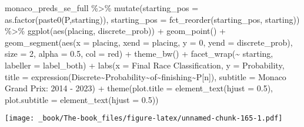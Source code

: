 \documentclass[
]{book}
\newenvironment{Shaded}{\begin{snugshade}}{\end{snugshade}}
\newcommand{\AttributeTok}[1]{\textcolor[rgb]{0.77,0.63,0.00}{#1}}
\newcommand{\DecValTok}[1]{\textcolor[rgb]{0.00,0.00,0.81}{#1}}
\newcommand{\FloatTok}[1]{\textcolor[rgb]{0.00,0.00,0.81}{#1}}
\newcommand{\FunctionTok}[1]{\textcolor[rgb]{0.00,0.00,0.00}{#1}}
\newcommand{\NormalTok}[1]{#1}
\newcommand{\SpecialCharTok}[1]{\textcolor[rgb]{0.00,0.00,0.00}{#1}}
\newcommand{\StringTok}[1]{\textcolor[rgb]{0.31,0.60,0.02}{#1}}
\begin{document}
\begin{Shaded}
\begin{Highlighting}[]
\NormalTok{monaco\_preds\_se\_full }\SpecialCharTok{\%\textgreater{}\%}
  \FunctionTok{mutate}\NormalTok{(}\AttributeTok{starting\_pos =} \FunctionTok{as.factor}\NormalTok{(}\FunctionTok{paste0}\NormalTok{(}\StringTok{\textquotesingle{}P\textquotesingle{}}\NormalTok{,starting)),}
         \AttributeTok{starting\_pos =} \FunctionTok{fct\_reorder}\NormalTok{(starting\_pos, starting)) }\SpecialCharTok{\%\textgreater{}\%}
  \FunctionTok{ggplot}\NormalTok{(}\FunctionTok{aes}\NormalTok{(placing, discrete\_prob)) }\SpecialCharTok{+}
  \FunctionTok{geom\_point}\NormalTok{() }\SpecialCharTok{+}
  \FunctionTok{geom\_segment}\NormalTok{(}\FunctionTok{aes}\NormalTok{(}\AttributeTok{x =}\NormalTok{ placing, }\AttributeTok{xend =}\NormalTok{ placing, }\AttributeTok{y =} \DecValTok{0}\NormalTok{, }\AttributeTok{yend =}\NormalTok{ discrete\_prob),}
               \AttributeTok{size =} \DecValTok{2}\NormalTok{, }\AttributeTok{alpha =} \FloatTok{0.5}\NormalTok{, }\AttributeTok{col =} \StringTok{\textquotesingle{}red\textquotesingle{}}\NormalTok{) }\SpecialCharTok{+}
  \FunctionTok{theme\_bw}\NormalTok{() }\SpecialCharTok{+}
  \FunctionTok{facet\_wrap}\NormalTok{(}\SpecialCharTok{\textasciitilde{}}\NormalTok{ starting, }\AttributeTok{labeller =}\NormalTok{ label\_both) }\SpecialCharTok{+}
  \FunctionTok{labs}\NormalTok{(}\AttributeTok{x =} \StringTok{\textquotesingle{}Final Race Classification\textquotesingle{}}\NormalTok{,}
       \AttributeTok{y =} \StringTok{\textquotesingle{}Probability\textquotesingle{}}\NormalTok{,}
       \AttributeTok{title =} \FunctionTok{expression}\NormalTok{(Discrete}\SpecialCharTok{\textasciitilde{}}\NormalTok{Probability}\SpecialCharTok{\textasciitilde{}}\NormalTok{of}\SpecialCharTok{\textasciitilde{}}\NormalTok{finishing}\SpecialCharTok{\textasciitilde{}}\NormalTok{P[n]),}
       \AttributeTok{subtitle =} \StringTok{\textquotesingle{}Monaco Grand Prix: 2014 {-} 2023\textquotesingle{}}\NormalTok{) }\SpecialCharTok{+}
  \FunctionTok{theme}\NormalTok{(}\AttributeTok{plot.title =} \FunctionTok{element\_text}\NormalTok{(}\AttributeTok{hjust =} \FloatTok{0.5}\NormalTok{),}
        \AttributeTok{plot.subtitle =} \FunctionTok{element\_text}\NormalTok{(}\AttributeTok{hjust =} \FloatTok{0.5}\NormalTok{)) }
\end{Highlighting}
\end{Shaded}

\texttt{[image: \_book/The-book\_files/figure-latex/unnamed-chunk-165-1.pdf]}
\end{document}
